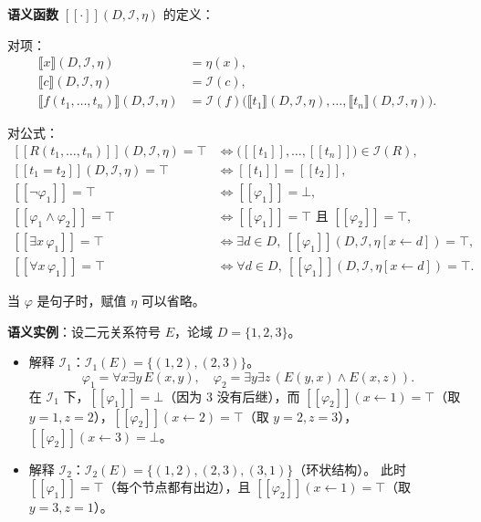 \documentclass[UTF8,11pt,a4paper]{ctexbook}   %
\theoremstyle{definition}
\begin{document}
\textbf{语义函数} $[\![\cdot]\!](D,\mathcal{I},\eta)$ 的定义：

对项：
\[
\begin{aligned}
\llbracket x\rrbracket(D,\mathcal{I},\eta) &= \eta(x),\\
\llbracket c\rrbracket(D,\mathcal{I},\eta) &= \mathcal{I}(c),\\
\llbracket f(t_1,\ldots,t_n)\rrbracket(D,\mathcal{I},\eta) &= \mathcal{I}(f)\bigl(\llbracket t_1\rrbracket(D,\mathcal{I},\eta),\ldots,\llbracket t_n\rrbracket(D,\mathcal{I},\eta)\bigr).
\end{aligned}
\]

对公式：
\[
\begin{aligned}
{}[\![R(t_1,\ldots,t_n)]\!](D,\mathcal{I},\eta)=\top &\iff \bigl([\![t_1]\!],\ldots,[\![t_n]\!]\bigr)\in\mathcal{I}(R),\\
[\![t_1=t_2]\!](D,\mathcal{I},\eta)=\top &\iff [\![t_1]\!]=[\![t_2]\!],\\
[\![\neg\varphi_1]\!]=\top &\iff [\![\varphi_1]\!]=\bot,\\
[\![\varphi_1\land\varphi_2]\!]=\top &\iff [\![\varphi_1]\!]=\top\text{ 且 }[\![\varphi_2]\!]=\top,\\
[\![\exists x\,\varphi_1]\!]=\top &\iff \exists d\in D,\ [\![\varphi_1]\!](D,\mathcal{I},\eta[x\leftarrow d])=\top,\\
[\![\forall x\,\varphi_1]\!]=\top &\iff \forall d\in D,\ [\![\varphi_1]\!](D,\mathcal{I},\eta[x\leftarrow d])=\top.
\end{aligned}
\]

当 $\varphi$ 是句子时，赋值 $\eta$ 可以省略。

\textbf{语义实例}：设二元关系符号 $E$，论域 $D=\{1,2,3\}$。
\begin{itemize}
    \item 解释 $\mathcal{I}_1$：$\mathcal{I}_1(E)=\{(1,2),(2,3)\}$。
    \[
    \varphi_1=\forall x\exists y\,E(x,y),\quad \varphi_2=\exists y\exists z\,(E(y,x)\land E(x,z)).
    \]
    在 $\mathcal{I}_1$ 下，$[\![\varphi_1]\!]=\bot$（因为 $3$ 没有后继），而 $[\![\varphi_2]\!](x\leftarrow 1)=\top$（取 $y=1,z=2$），$[\![\varphi_2]\!](x\leftarrow 2)=\top$（取 $y=2,z=3$），$[\![\varphi_2]\!](x\leftarrow 3)=\bot$。
    
    \item 解释 $\mathcal{I}_2$：$\mathcal{I}_2(E)=\{(1,2),(2,3),(3,1)\}$（环状结构）。
    此时 $[\![\varphi_1]\!]=\top$（每个节点都有出边），且 $[\![\varphi_2]\!](x\leftarrow 1)=\top$（取 $y=3,z=1$）。
\end{itemize}
\end{document}
